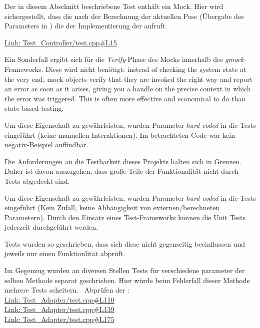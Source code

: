 \clearpage
{}
Der in diesem Abschnitt beschriebene Test enthält ein Mock.
Hier wird sichergestellt, dass die  nach der Berechnung der aktuellen Pose (Übergabe des Parameters in ) die  der Implementierung der  aufruft.

\href{https://github.com/MobMonRob/ROSLabDrohne/blob/9edc7b5814c1bb731abf0f7af4352289e57b681f/Code/Test\_Controller/test.cpp\#L15}{Link: Test\_Controller/test.cpp\#L15}

Ein Sonderfall ergibt sich für die \textit{Verify}-Phase des Mocks innerhalb des \textit{gmock}-Frameworks. Diese wird nicht benötigt:
\glqq instead of checking the system state at the very end, mock objects verify that they are invoked the right way and report an error as soon as it arises, giving you a handle on the precise context in which the error was triggered. This is often more effective and economical to do than state-based testing.\grqq \cite{gmockFAQ}


Um diese Eigenschaft zu gewährleisten, wurden Parameter \textit{hard coded} in die Tests eingeführt (keine manuellen Interaktionen).
Im betrachteten Code war kein negativ-Beispiel auffindbar.


Die Anforderungen an die Testbarkeit dieses Projekts halten sich in Grenzen. Daher ist davon auszugehen, dass große Teile der Funktionalität nicht durch Tests abgedeckt sind.\\


Um diese Eigenschaft zu gewährleisten, wurden Parameter \textit{hard coded} in die Tests eingeführt (Kein Zufall, keine Abhängigkeit von externen/berechneten Parametern).
Durch den Einsatz eines Test-Frameworks können die Unit Tests jederzeit durchgeführt werden.


Tests wurden so geschrieben, dass sich diese nicht gegenseitig beeinflussen und jeweils nur einen Funktionlität abprüft.

Im Gegenzug wurden an diversen Stellen Tests für verschiedene parameter der selben Methode separat geschrieben. Hier würde beim Fehlerfall dieser Methode mehrere Tests scheitern.
\zB\ Abprüfen der :\\
\href{https://github.com/MobMonRob/ROSLabDrohne/blob/9edc7b5814c1bb731abf0f7af4352289e57b681f/Code/Test\_Adapter/test.cpp\#L110}{Link: Test\_Adapter/test.cpp\#L110}\\
\href{https://github.com/MobMonRob/ROSLabDrohne/blob/9edc7b5814c1bb731abf0f7af4352289e57b681f/Code/Test\_Adapter/test.cpp\#L139}{Link: Test\_Adapter/test.cpp\#L139}\\
\href{https://github.com/MobMonRob/ROSLabDrohne/blob/9edc7b5814c1bb731abf0f7af4352289e57b681f/Code/Test\_Adapter/test.cpp\#L175}{Link: Test\_Adapter/test.cpp\#L175}

